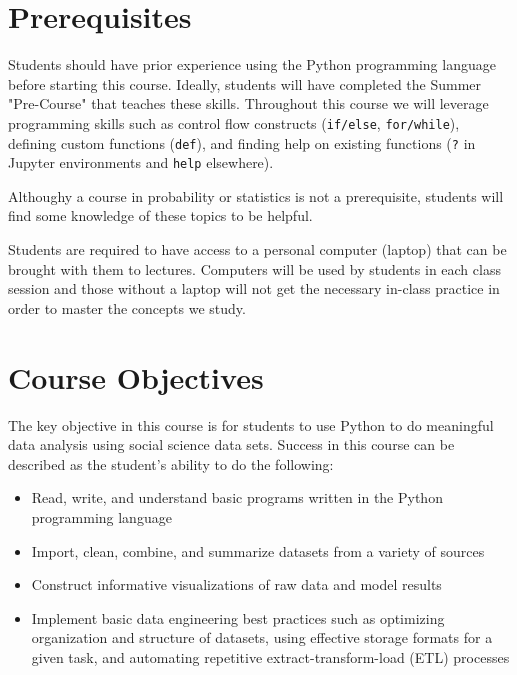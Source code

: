 \documentclass[11pt]{article}
\begin{document}
%
%
\section*{Prerequisites}

  Students should have prior experience using the Python programming language
  before starting this course. Ideally, students will have completed the Summer
  "Pre-Course" that teaches these skills. Throughout this course we will
  leverage programming skills such as control flow constructs (\texttt{if/else},
  \texttt{for/while}), defining custom functions (\texttt{def}), and finding
  help on existing functions (\texttt{?} in Jupyter environments and
  \texttt{help} elsewhere).

  \bigskip

  \noindent Althoughy a course in probability or statistics is not a prerequisite, students will
  find some knowledge of these topics to be helpful.

  \bigskip

  \noindent Students are required to have access to a personal computer (laptop)
  that can be brought with them to lectures. Computers will be used by students
  in each class session and those without a laptop will not get the necessary
  in-class practice in order to master the concepts we study.

%
%
\section*{Course Objectives}

  The key objective in this course is for students to use Python to do
  meaningful data analysis using social science data sets. Success in this
  course can be described as the student's ability to do the following:

  \begin{itemize}
    \item Read, write, and understand basic programs written in the Python
    programming language
    \item Import, clean, combine, and summarize datasets from a variety of sources
    \item Construct informative visualizations of raw data and model results
    \item Implement basic data engineering best practices such as optimizing
    organization and structure of datasets, using effective storage formats for
    a given task, and automating repetitive extract-transform-load (ETL)
    processes
  \end{itemize}
\end{document}
